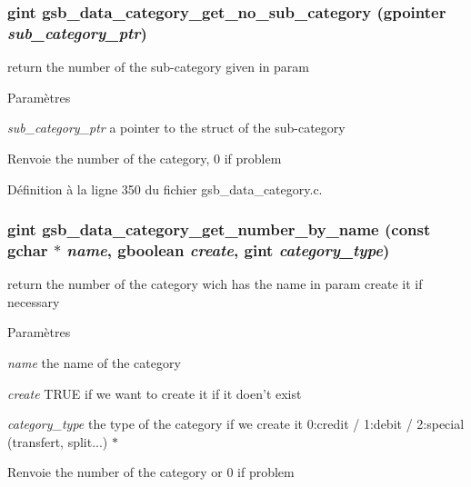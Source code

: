 \subsubsection[{gsb\_\-data\_\-category\_\-get\_\-no\_\-sub\_\-category}]{\setlength{\rightskip}{0pt plus 5cm}gint gsb\_\-data\_\-category\_\-get\_\-no\_\-sub\_\-category (gpointer {\em sub\_\-category\_\-ptr})}\label{gsb__data__category_8h_a55a6b25f3fe1e0c08f603308ab091d97}
return the number of the sub-\/category given in param


\begin{DoxyParams}{Paramètres}
\item[{\em sub\_\-category\_\-ptr}]a pointer to the struct of the sub-\/category\end{DoxyParams}
\begin{DoxyReturn}{Renvoie}
the number of the category, 0 if problem 
\end{DoxyReturn}


Définition à la ligne 350 du fichier gsb\_\-data\_\-category.c.

\subsubsection[{gsb\_\-data\_\-category\_\-get\_\-number\_\-by\_\-name}]{\setlength{\rightskip}{0pt plus 5cm}gint gsb\_\-data\_\-category\_\-get\_\-number\_\-by\_\-name (const gchar $\ast$ {\em name}, \/  gboolean {\em create}, \/  gint {\em category\_\-type})}\label{gsb__data__category_8h_a0829907fff4f8dda3487debb5f2cc43f}
return the number of the category wich has the name in param create it if necessary


\begin{DoxyParams}{Paramètres}
\item[{\em name}]the name of the category \item[{\em create}]TRUE if we want to create it if it doen't exist \item[{\em category\_\-type}]the type of the category if we create it 0:credit / 1:debit / 2:special (transfert, split...) $\ast$ \end{DoxyParams}
\begin{DoxyReturn}{Renvoie}
the number of the category or 0 if problem 
\end{DoxyReturn}


